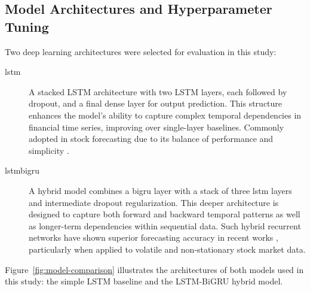 \subsection{Model Architectures and Hyperparameter Tuning}

Two deep learning architectures were selected for evaluation in this study: 

\begin{description}
    \item[\acrshort{lstm}] A stacked LSTM architecture with two LSTM layers, each followed by dropout, and a final dense 
    layer for output prediction. This structure enhances the model's ability to capture complex temporal dependencies in 
    financial time series, improving over single-layer baselines. Commonly adopted in stock forecasting due to its balance 
    of performance and simplicity \parencite{parmar2018stock, phuoc2024StockPrediction}.
    \item[\acrshort{lstmbigru}] A hybrid model combines a \acrshort{bigru} layer with a stack of three
    \acrshort{lstm} layers and intermediate dropout regularization. This deeper architecture is
    designed to capture both forward and backward temporal patterns as well as longer-term 
    dependencies within sequential data. Such hybrid recurrent networks have shown superior
    forecasting accuracy in recent works
    \parencite{shaban2024SMPDL, chang2024StockPrediction, guo2024LSTMStock}, particularly 
    when applied to volatile and non-stationary stock market data.
\end{description}

Figure~\ref{fig:model-comparison} illustrates the architectures of both models used in this 
study: the simple LSTM baseline and the LSTM-BiGRU hybrid model.

